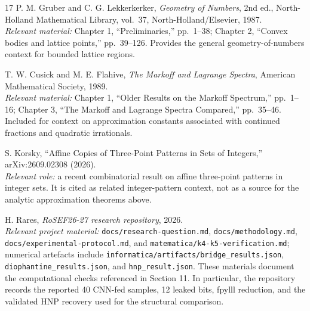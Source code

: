 \documentclass[12pt]{article}
\begin{document}
\begin{thebibliography}{17}
P. M. Gruber and C. G. Lekkerkerker, \emph{Geometry of Numbers}, 2nd ed., North-Holland Mathematical Library, vol.~37, North-Holland/Elsevier, 1987.\\
\textit{Relevant material:} Chapter 1, ``Preliminaries,'' pp.~1--38; Chapter 2, ``Convex bodies and lattice points,'' pp.~39--126. Provides the general geometry-of-numbers context for bounded lattice regions.

T. W. Cusick and M. E. Flahive, \emph{The Markoff and Lagrange Spectra}, American Mathematical Society, 1989.\\
\textit{Relevant material:} Chapter 1, ``Older Results on the Markoff Spectrum,'' pp.~1--16; Chapter 3, ``The Markoff and Lagrange Spectra Compared,'' pp.~35--46. Included for context on approximation constants associated with continued fractions and quadratic irrationals.

S. Korsky, ``Affine Copies of Three-Point Patterns in Sets of Integers,'' arXiv:2609.02308 (2026).\\
\textit{Relevant role:} a recent combinatorial result on affine three-point patterns in integer sets. It is cited as related integer-pattern context, not as a source for the analytic approximation theorems above.

H. Rares, \emph{RoSEF26-27 research repository}, 2026.\\
\textit{Relevant project material:} \texttt{docs/research-question.md}, \texttt{docs/methodology.md}, \texttt{docs/experimental-protocol.md}, and \texttt{matematica/k4-k5-verification.md}; numerical artefacts include \texttt{informatica/artifacts/bridge\_results.json}, \texttt{diophantine\_results.json}, and \texttt{hnp\_result.json}. These materials document the computational checks referenced in Section 11. In particular, the repository records the reported 40 CNN-fed samples, 12 leaked bits, fpylll reduction, and the validated HNP recovery used for the structural comparison.

\end{thebibliography}
\end{document}
